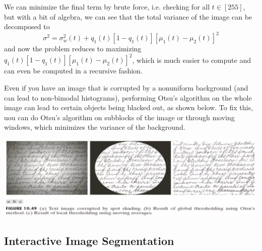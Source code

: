 \documentclass{article}
\begin{document}
    We can minimize the final term by brute force, i.e. checking for all $t \in [255]$, but with a bit of algebra, we can see that the total variance of the image can be decomposed to 
    \[\sigma^2 = \sigma_w^2 (t) + q_1(t) [1 - q_1(t)][\mu_1 (t) - \mu_2(t)]^2\]
    and now the problem reduces to maximizing $q_1(t) [1 - q_1(t)][\mu_1 (t) - \mu_2(t)]^2$, which is much easier to compute and can even be computed in a recursive fashion. 

    Even if you have an image that is corrupted by a nonuniform background (and can lead to non-bimodal histograms), performing Otsu's algorithm on the whole image can lead to certain objects being blacked out, as shown below. To fix this, uou can do Otsu's algorithm on subblocks of the image or through moving windows, which minimizes the variance of the background. 
    \begin{center}
        \includegraphics[scale=0.3]{img/otsu2.png}
    \end{center}

  \subsection{Interactive Image Segmentation}
\end{document}
